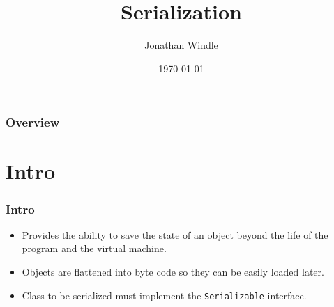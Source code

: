 \documentclass{beamer}
\title[Serialisation]{Serialization} %
\author{Jonathan Windle} %
\institute[UEA] %
{
University of East Anglia \\ %
\medskip
\textit{J.Windle@uea.ac.uk} %
}
\date{\today} %
\begin{document}
\begin{frame}
\titlepage %
\end{frame}

\begin{frame}[allowframebreaks]
\frametitle{Overview} %
\tableofcontents %
\end{frame}

\section{Intro}
\begin{frame}
\frametitle{Intro}
\begin{itemize}
\item Provides the ability to save the {\color{red} state} of an {\color{green} object} beyond the life of the program and the virtual machine.
\item {\color{green} Objects} are flattened into {\color{purple} byte code} so they can be easily loaded later.
\item Class to be serialized must implement the \texttt{Serializable} interface.
\end{itemize}
\end{frame}
\end{document}
